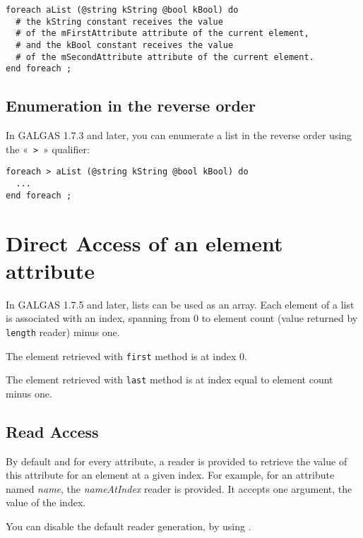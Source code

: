 \begin{lstlisting}[language=galgas]
foreach aList (@string kString @bool kBool) do
  # the kString constant receives the value
  # of the mFirstAttribute attribute of the current element,
  # and the kBool constant receives the value
  # of the mSecondAttribute attribute of the current element.
end foreach ;
\end{lstlisting}

\subsection{Enumeration in the reverse order}

In GALGAS 1.7.3 and later, you can enumerate a list in the reverse order using the «~\lstinline[language=galgas]!>!~» qualifier:

\begin{lstlisting}[language=galgas]
foreach > aList (@string kString @bool kBool) do
  ...
end foreach ;
\end{lstlisting}




\section{Direct Access of an element attribute}

In GALGAS 1.7.5 and later, lists can be used as an array. Each element of a list is associated with an  index, spanning from 0 to element count (value returned by \lstinline[language=galgas]!length! reader) minus one.

The element retrieved with \lstinline[language=galgas]!first! method is at index 0.

The element retrieved with \lstinline[language=galgas]!last! method is at index equal to element count minus one.

\subsection{Read Access}

By default and for every attribute, a reader is provided to retrieve the value of this attribute for an element at a given index. For example, for an attribute named \emph{name}, the \emph{nameAtIndex} reader is provided. It accepts one  argument, the value of the index.

You can disable the default reader generation, by using .

